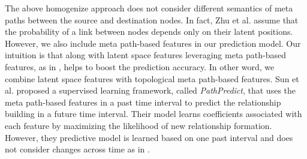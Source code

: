 The above homogenize approach does not consider different semantics of meta paths between the source and destination nodes. In fact, Zhu et al. \cite{Zhu2016} assume that the probability of a link between nodes depends only on their latent positions. However, we also include meta path-based features in our prediction model. Our intuition is that along with latent space features leveraging meta path-based features, as in \cite{sun2011ASONAM}, helps to boost the prediction accuracy. In other word, we combine latent space features with topological meta path-based features. Sun et al. \cite{sun2011ASONAM} proposed a supervised learning framework, called \textit{PathPredict}, that uses the meta path-based features in a past time interval to predict the relationship building in a future time interval. Their model learns coefficients associated with each feature by maximizing the likelihood of new relationship formation. However, they predictive model is learned based on one past interval and does not consider changes across time as in \cite{Zhu2016}.


